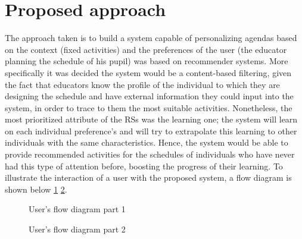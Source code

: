 \documentclass[10pt,twocolumn,letterpaper]{article}
\begin{document}
\section{Proposed approach}
The approach taken is to build a system capable of personalizing agendas based on the context (fixed activities) and the preferences of the user (the educator planning the schedule of his pupil) was based on recommender systems. More specifically it was decided the system would be a content-based filtering, given the fact that educators know the profile of the individual to which they are designing the schedule and have external information they could input into the system, in order to trace to them the most suitable activities. Nonetheless, the most prioritized attribute of the RSs was the learning one; the system will learn on each individual preference's and will try to extrapolate this learning to other individuals with the same characteristics. Hence, the system would be able to provide recommended activities for the schedules of individuals who have never had this type of attention before, boosting the progress of their learning. To illustrate the interaction of a user with the proposed system, a flow diagram is shown below \ref{fig:user_workflow1} \ref{fig:user_workflow2}.
\begin{figure}[h]
       \centering
       \caption{User's flow diagram part 1}
    \label{fig:user_workflow1}
\end{figure}
\begin{figure}[h]
       \centering
       \caption{User's flow diagram part 2}
    \label{fig:user_workflow2}
\end{figure}
\end{document}
